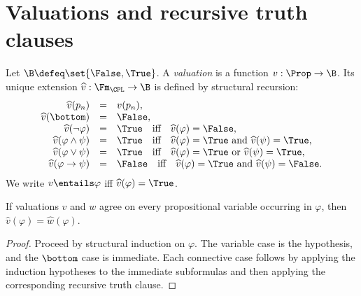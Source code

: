 \section{Valuations and recursive truth clauses}
\label{sec:prop-syntax-semantics-02}

\begin{definition}
Let \(\B\defeq\set{\False,\True}\).  A \emph{valuation} is a function
\(v:\Prop\to\B\).  Its unique extension
\(\widehat v:\Fm_{\CPL}\to\B\) is defined by structural recursion:
\[
\begin{array}{rcl}
\widehat v(p_n)&=&v(p_n),\\
\widehat v(\bottom)&=&\False,\\
\widehat v(\neg\varphi)&=&\True
  \quad\text{iff}\quad\widehat v(\varphi)=\False,\\
\widehat v(\varphi\land\psi)&=&\True
  \quad\text{iff}\quad
  \widehat v(\varphi)=\True\text{ and }\widehat v(\psi)=\True,\\
\widehat v(\varphi\lor\psi)&=&\True
  \quad\text{iff}\quad
  \widehat v(\varphi)=\True\text{ or }\widehat v(\psi)=\True,\\
\widehat v(\varphi\to\psi)&=&\False
  \quad\text{iff}\quad
  \widehat v(\varphi)=\True\text{ and }\widehat v(\psi)=\False.
\end{array}
\]
We write \(v\entails\varphi\) iff
\(\widehat v(\varphi)=\True\).
\end{definition}

\begin{lemma}
\label{lem:prop-coincidence}
If valuations \(v\) and \(w\) agree on every propositional variable occurring
in \(\varphi\), then
\(\widehat v(\varphi)=\widehat w(\varphi)\).
\end{lemma}
\begin{proof}
Proceed by structural induction on \(\varphi\).  The variable case is the
hypothesis, and the \(\bottom\) case is immediate.  Each connective case
follows by applying the induction hypotheses to the immediate subformulas and
then applying the corresponding recursive truth clause.
\end{proof}

